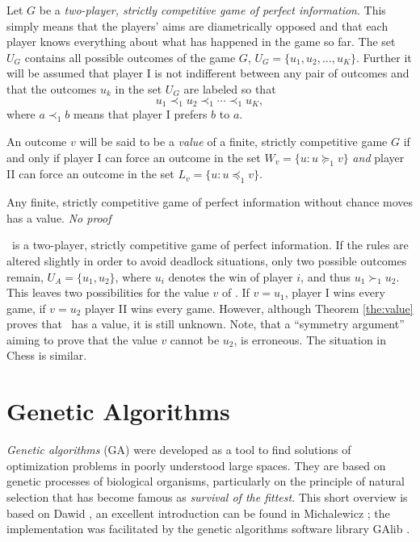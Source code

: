Let $G$ be a \emph{two-player, strictly competitive game of perfect information}.  This simply means that the players' aims are diametrically opposed and that each player knows everything about what has happened in the game so far. The set $U_G$ contains all possible outcomes of the game $G$, $U_G = \{u_1,u_2,\ldots,u_K\}$. Further it will be assumed that player I is not indifferent between any pair of outcomes and that the outcomes $u_k$ in the set $U_G$ are labeled so that 
$$ u_1 \prec_1 u_2 \prec_1 \cdots \prec_1 u_K,$$ 
where $a \prec_1 b$ means that player I prefers $b$ to $a$.

\begin{definition}
An outcome $v$ will be said to be a \emph{value} of a finite, strictly competitive game $G$ if and only if player I can force an outcome in the set $W_v = \{u: u \succeq_1 v\}$ \emph{and} player II can force an outcome in the set $L_v = \{u: u \preceq_1 v\}$. 
\end{definition}

\begin{theorem} \label{the:value}
Any finite, strictly competitive game of perfect information without chance moves has a value. \hfill \it No proof
\end{theorem}
\Abalone\ is a two-player, strictly competitive game of perfect information. If the rules are altered slightly in order to avoid deadlock situations, only two possible outcomes remain, $U_A = \{u_1, u_2\}$, where $u_i$ denotes the win of player $i$, and thus $u_1 \succ_1 u_2$. This leaves two possibilities for the value $v$ of \Abalone. If $v=u_1$, player I wins every game, if $v=u_2$ player II wins every game. However, although Theorem \ref{the:value} proves that \Abalone\ has a value, it is still unknown. Note, that a ``symmetry argument'' aiming to prove that the value $v$ cannot be $u_2$, is erroneous. The situation in Chess is similar.













\section{Genetic Algorithms} 
\emph{Genetic algorithms} (GA) were developed as a tool to find solutions of optimization problems in poorly understood large spaces. They are based on genetic processes of biological organisms, particularly on the principle of natural selection that has become famous as \emph{survival of the fittest}. This short overview is based on Dawid \cite{Dawid96}, an excellent introduction can be found in Michalewicz \cite{Michalewicz96}; the implementation was facilitated by the genetic algorithms software library GAlib \cite{Galib}.

